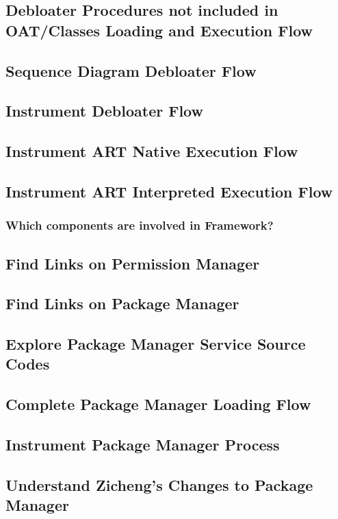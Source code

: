 \subsection{Debloater Procedures not included in OAT/Classes Loading and Execution Flow}

\subsection{Sequence Diagram Debloater Flow}

\subsection{Instrument Debloater Flow}

\subsection{Instrument ART Native Execution Flow}

\subsection{Instrument ART Interpreted Execution Flow}

\subsubsection{Which components are involved in Framework?}
\subsection{Find Links on Permission Manager}
\subsection{Find Links on Package Manager}
\subsection{Explore Package Manager Service Source Codes}
\subsection{Complete Package Manager Loading Flow}
\subsection{Instrument Package Manager Process}
\subsection{Understand Zicheng's Changes to Package Manager}

